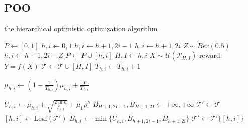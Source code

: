 \documentclass[a4paper,10pt]{article}
\begin{document}
\subsection{POO}
\begin{algorithm}[!Htop]
\caption{the hierarchical optimistic optimization algorithm}
\begin{algorithmic}[1]
		\State $P \gets {[0,1]}$
		\State $h,i\gets 0,1$
				\State $h,i \gets h+1,2i-1 $
				\State $h,i \gets h+1,2i $
			\Else
				\State $Z \sim Ber(0.5)$
				\State $h,i \gets h+1,2i-Z$
			\EndIf
			\State $P \gets P \cup {[h,i]}$
		\EndWhile
		\State $H,I \gets h,i$
		\State $X \sim \mathcal{U}(\mathcal{P}_{H,I})$
		\State reward: $Y = f(X)$
		\State $\mathcal{T} \gets \mathcal{T} \cup {[H,I]}$
			\State $T_{h,i} \gets T_{h,i}+1$
			\begin{large}
			\State $\mu_{h,i}\gets (1-\frac{1}{T_{h,i}})\mu_{h,i}+\frac{Y}{T_{h,i}}$
			\end{large}
		\EndFor
			\State $U_{h,i}\gets \mu_{h,i}+\sqrt{\frac{2\ln n}{T_{h,i}}}+\mu_1 \rho^h$
		\EndFor
		\State $B_{H+1,2I-1},B_{H+1,2I} \gets +\infty,+\infty$
		\State $\mathcal{T}' \gets \mathcal{T}$
			\State $[h,i] \gets \text{Leaf}(\mathcal{T}')$
			\State $B_{h,i} \gets \min\{U_{h,i},B_{h+1,2i-1},B_{h+1,2i}\}$
			\State $\mathcal{T}' \gets \mathcal{T}'\{[h,i]\}$
		\EndWhile
	\EndFor
\end{algorithmic}
\end{algorithm}
\end{document}
